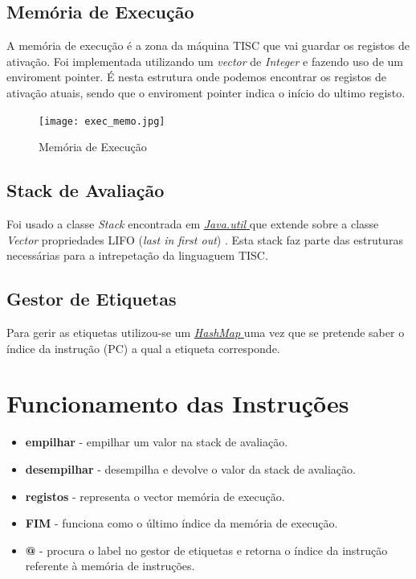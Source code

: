 \documentclass[a4paper,12pt,headings=small]{article}
\begin{document}
\subsection{Memória de Execução}
\FloatBarrier
A memória de execução é a zona da máquina TISC que vai guardar os registos de ativação. Foi implementada utilizando um \textit{vector} de \textit{Integer} e fazendo uso de um enviroment pointer. É nesta estrutura onde podemos encontrar os registos de ativação atuais, sendo que o enviroment pointer indica o início do ultimo registo. 

\FloatBarrier
\begin{figure}[h]
    \centering
    \texttt{[image: exec\_memo.jpg]}
    \caption{Memória de Execução}
    \label{fig:my_label}
\end{figure}


\subsection{Stack de Avaliação}
\FloatBarrier
Foi usado a classe \textit{Stack} encontrada em \hyperlink{stack}{ \textit{Java.util} } que extende sobre a classe \textit{Vector} propriedades LIFO (\textit{last in first out}) . Esta stack faz parte das estruturas necessárias para a intrepetação da linguaguem TISC.


\subsection{Gestor de Etiquetas}
\FloatBarrier
Para gerir as etiquetas utilizou-se um \hyperlink{hashmap}{ \textit{\textit{HashMap}} } uma vez que se pretende saber o índice
da instrução (PC) a qual a etiqueta corresponde.


\section{Funcionamento das Instruções}
\begin{itemize}
\item \textbf{empilhar} - empilhar um valor na stack de avaliação.
\item \textbf{desempilhar} - desempilha e devolve o valor da stack de avaliação.
\item \textbf{registos} - representa o vector memória de execução.
\item \textbf{FIM} - funciona como o último índice da memória de execução.
\item \textbf{@} - procura o label no gestor de etiquetas e retorna o índice da instrução referente à memória de instruções.
\end{itemize}
\end{document}
